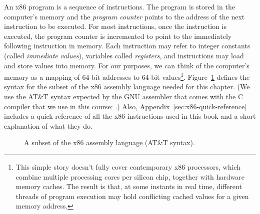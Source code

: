 \documentclass[11pt]{book}
\begin{document}
An x86 program is a sequence of instructions. The program is stored in the
computer's memory and the \emph{program counter} points to the address of the
next instruction to be executed. For most instructions, once the instruction is
executed, the program counter is incremented to point to the immediately
following instruction in memory.  Each instruction may refer to integer
constants (called \emph{immediate values}), variables called \emph{registers},
and instructions may load and store values into memory.  For our purposes, we
can think of the computer's memory as a mapping of 64-bit addresses to 64-bit
%
values\footnote{This simple story doesn't fully cover contemporary x86
  processors, which combine multiple processing cores per silicon chip, together
  with hardware memory caches.  The result is that, at some instants in real
  time, different threads of program execution may hold conflicting
  cached values for a given memory address.}.
%
Figure~\ref{fig:x86-a} defines the syntax for the
subset of the x86 assembly language needed for this chapter.
%
(We use the AT\&T syntax expected by the GNU assembler that comes with the C
compiler that we use in this course: .)
%
Also, Appendix~\ref{sec:x86-quick-reference} includes a quick-reference of all
the x86 instructions used in this book and a short explanation of what they do.



\newcommand{\allregisters}{\key{rsp} \mid \key{rbp} \mid \key{rax} \mid \key{rbx} \mid \key{rcx}
              \mid \key{rdx} \mid \key{rsi} \mid \key{rdi} \mid \\
              && \key{r8} \mid \key{r9} \mid \key{r10}
              \mid \key{r11} \mid \key{r12} \mid \key{r13}
              \mid \key{r14} \mid \key{r15}}

\begin{figure}[tp]
\fbox{
\begin{minipage}{0.96\textwidth}
\[
\begin{array}{lcl}
\Reg &::=& \allregisters{} \\
\Arg &::=&  \key{\$}\Int \mid \key{\%}\Reg \mid \Int(\key{\%}\Reg) \\
\Instr &::=& \key{addq} \; \Arg, \Arg \mid
      \key{subq} \; \Arg, \Arg \mid
      \key{negq} \; \Arg \mid \key{movq} \; \Arg, \Arg \mid \\
  &&  \key{callq} \; \mathit{label} \mid
      \key{pushq}\;\Arg \mid \key{popq}\;\Arg \mid \key{retq} \\
\Prog &::= & \key{.globl main}\\
      &    & \key{main:} \; \Instr^{+}
\end{array}
\]
\end{minipage}
}
\caption{A subset of the x86 assembly language (AT\&T syntax).}
\label{fig:x86-a}
\end{figure}
\end{document}

